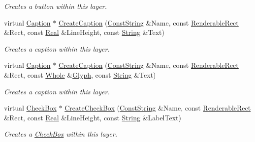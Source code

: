 \begin{DoxyCompactItemize}
\begin{DoxyCompactList}\small\item\em Creates a button within this layer. \item\end{DoxyCompactList}\item 
virtual \hyperlink{classMezzanine_1_1UI_1_1Caption}{Caption} $\ast$ \hyperlink{classMezzanine_1_1UI_1_1Layer_a9b7d6e9d2865a8e5ac03732888f22647}{CreateCaption} (\hyperlink{namespaceMezzanine_a63cd699ac54b73953f35ec9cfc05e506}{ConstString} \&Name, const \hyperlink{structMezzanine_1_1UI_1_1RenderableRect}{RenderableRect} \&Rect, const \hyperlink{namespaceMezzanine_a726731b1a7df72bf3583e4a97282c6f6}{Real} \&LineHeight, const \hyperlink{namespaceMezzanine_acf9fcc130e6ebf08e3d8491aebcf1c86}{String} \&Text)
\begin{DoxyCompactList}\small\item\em Creates a caption within this layer. \item\end{DoxyCompactList}\item 
virtual \hyperlink{classMezzanine_1_1UI_1_1Caption}{Caption} $\ast$ \hyperlink{classMezzanine_1_1UI_1_1Layer_a3849f71d1ea5bf31c2a6a0773d5ac309}{CreateCaption} (\hyperlink{namespaceMezzanine_a63cd699ac54b73953f35ec9cfc05e506}{ConstString} \&Name, const \hyperlink{structMezzanine_1_1UI_1_1RenderableRect}{RenderableRect} \&Rect, const \hyperlink{namespaceMezzanine_adcbb6ce6d1eb4379d109e51171e2e493}{Whole} \&\hyperlink{classMezzanine_1_1UI_1_1Glyph}{Glyph}, const \hyperlink{namespaceMezzanine_acf9fcc130e6ebf08e3d8491aebcf1c86}{String} \&Text)
\begin{DoxyCompactList}\small\item\em Creates a caption within this layer. \item\end{DoxyCompactList}\item 
virtual \hyperlink{classMezzanine_1_1UI_1_1CheckBox}{CheckBox} $\ast$ \hyperlink{classMezzanine_1_1UI_1_1Layer_a04e2d1bff31f8c01063498ce87e3138a}{CreateCheckBox} (\hyperlink{namespaceMezzanine_a63cd699ac54b73953f35ec9cfc05e506}{ConstString} \&Name, const \hyperlink{structMezzanine_1_1UI_1_1RenderableRect}{RenderableRect} \&Rect, const \hyperlink{namespaceMezzanine_a726731b1a7df72bf3583e4a97282c6f6}{Real} \&LineHeight, const \hyperlink{namespaceMezzanine_acf9fcc130e6ebf08e3d8491aebcf1c86}{String} \&LabelText)
\begin{DoxyCompactList}\small\item\em Creates a \hyperlink{classMezzanine_1_1UI_1_1CheckBox}{CheckBox} within this layer. \item\end{DoxyCompactList}\item 

\end{DoxyCompactItemize}
